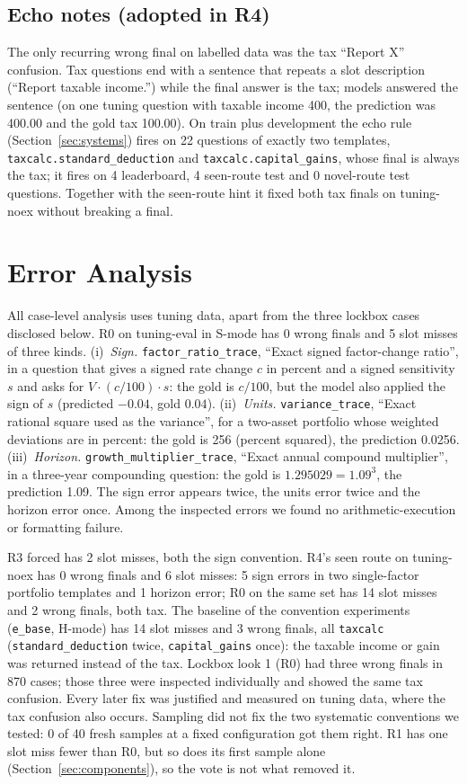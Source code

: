 \documentclass[conference]{IEEEtran}
\newcommand{\id}[1]{\texttt{#1}}
\begin{document}
\subsection{Echo notes (adopted in R4)}\label{sec:echo}
The only recurring wrong final on labelled data was the tax ``Report X'' confusion. Tax questions end with a sentence that repeats a slot description (``Report taxable income.'') while the final answer is the tax; models answered the sentence (on one tuning question with taxable income 400, the prediction was 400.00 and the gold tax 100.00). On train plus development the echo rule (Section~\ref{sec:systems}) fires on 22 questions of exactly two templates, \id{taxcalc.standard\_deduction} and \id{taxcalc.capital\_gains}, whose final is always the tax; it fires on 4 leaderboard, 4 seen-route test and 0 novel-route test questions. Together with the seen-route hint it fixed both tax finals on tuning-noex without breaking a final.

\section{Error Analysis}\label{sec:errors}
All case-level analysis uses tuning data, apart from the three lockbox cases disclosed below. R0 on tuning-eval in S-mode has 0 wrong finals and 5 slot misses of three kinds. (i)~\emph{Sign.} \id{factor\_ratio\_trace}, ``Exact signed factor-change ratio'', in a question that gives a signed rate change $c$ in percent and a signed sensitivity $s$ and asks for $V\cdot(c/100)\cdot s$: the gold is $c/100$, but the model also applied the sign of $s$ (predicted $-0.04$, gold $0.04$). (ii)~\emph{Units.} \id{variance\_trace}, ``Exact rational square used as the variance'', for a two-asset portfolio whose weighted deviations are in percent: the gold is 256 (percent squared), the prediction 0.0256. (iii)~\emph{Horizon.} \id{growth\_multiplier\_trace}, ``Exact annual compound multiplier'', in a three-year compounding question: the gold is $1.295029=1.09^3$, the prediction 1.09. The sign error appears twice, the units error twice and the horizon error once. Among the inspected errors we found no arithmetic-execution or formatting failure.

R3 forced has 2 slot misses, both the sign convention. R4's seen route on tuning-noex has 0 wrong finals and 6 slot misses: 5 sign errors in two single-factor portfolio templates and 1 horizon error; R0 on the same set has 14 slot misses and 2 wrong finals, both tax. The baseline of the convention experiments (\id{e\_base}, H-mode) has 14 slot misses and 3 wrong finals, all \id{taxcalc} (\id{standard\_deduction} twice, \id{capital\_gains} once): the taxable income or gain was returned instead of the tax. Lockbox look 1 (R0) had three wrong finals in 870 cases; those three were inspected individually and showed the same tax confusion. Every later fix was justified and measured on tuning data, where the tax confusion also occurs. Sampling did not fix the two systematic conventions we tested: 0 of 40 fresh samples at a fixed configuration got them right. R1 has one slot miss fewer than R0, but so does its first sample alone (Section~\ref{sec:components}), so the vote is not what removed it.
\end{document}
